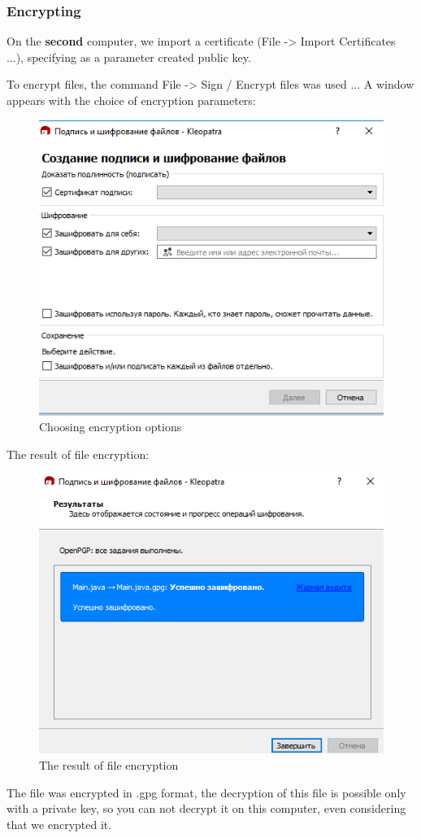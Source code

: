 \documentclass[14pt,a4paper,report]{report}
\begin{document}
\subsubsection{Encrypting}

On the \textbf{second} computer, we import a certificate (File -> Import Certificates ...), specifying as a parameter created public key.

To encrypt files, the command File -> Sign / Encrypt files was used ... A window appears with the choice of encryption parameters:

\begin{figure}[h!]
	\centering
	\includegraphics[scale = 0.53]{images/2_2.png}
	\caption{Choosing encryption options}
\end{figure}

The result of file encryption:

\begin{figure}[h!]
	\centering
	\includegraphics[scale = 0.6]{images/2_4.png}
	\caption{The result of file encryption}
\end{figure}
\newpage
The file was encrypted in .gpg format, the decryption of this file is possible only with a private key, so you can not decrypt it on this computer, even considering that we encrypted it.
\end{document}
